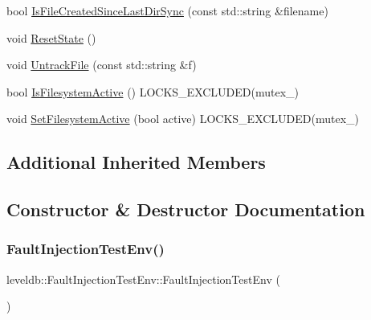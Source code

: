 \begin{DoxyCompactItemize}
\item 
bool \mbox{\hyperlink{classleveldb_1_1_fault_injection_test_env_ae9460fecd27d35869bfc4de6ff4538e3}{Is\+File\+Created\+Since\+Last\+Dir\+Sync}} (const std\+::string \&filename)
\item 
void \mbox{\hyperlink{classleveldb_1_1_fault_injection_test_env_ae4f5f304ef1ae31a3da13efec88601f6}{Reset\+State}} ()
\item 
void \mbox{\hyperlink{classleveldb_1_1_fault_injection_test_env_a491627b6a1908395df803482839fa7f1}{Untrack\+File}} (const std\+::string \&f)
\item 
bool \mbox{\hyperlink{classleveldb_1_1_fault_injection_test_env_ac789749a61e5ac70906d23c0af2eb26e}{Is\+Filesystem\+Active}} () L\+O\+C\+K\+S\+\_\+\+E\+X\+C\+L\+U\+D\+ED(mutex\+\_\+)
\item 
void \mbox{\hyperlink{classleveldb_1_1_fault_injection_test_env_a0931f1fd0c96e617dd226cb2cdc44ad7}{Set\+Filesystem\+Active}} (bool active) L\+O\+C\+K\+S\+\_\+\+E\+X\+C\+L\+U\+D\+ED(mutex\+\_\+)
\end{DoxyCompactItemize}
\subsection*{Additional Inherited Members}


\subsection{Constructor \& Destructor Documentation}
\mbox{\label{classleveldb_1_1_fault_injection_test_env_ac997cc4e898833449565bfcd1ff419ba}} 
\subsubsection{\texorpdfstring{FaultInjectionTestEnv()}{FaultInjectionTestEnv()}}
{\footnotesize\ttfamily leveldb\+::\+Fault\+Injection\+Test\+Env\+::\+Fault\+Injection\+Test\+Env (\begin{DoxyParamCaption}{ }\end{DoxyParamCaption})\hspace{0.3cm}{\ttfamily [inline]}}

\mbox{\label{classleveldb_1_1_fault_injection_test_env_aacf6c0672dc27bced909f7b638fc5269}} 
